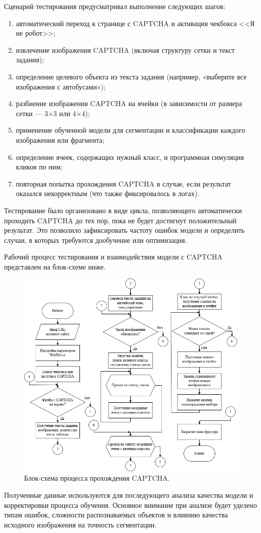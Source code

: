 Сценарий тестирования предусматривал выполнение следующих шагов:

\begin{enumerate}
    \item автоматический переход к странице с CAPTCHA и активация чекбокса <<Я не робот>>;
    \item извлечение изображения CAPTCHA (включая структуру сетки и текст задания);
    \item определение целевого объекта из текста задания (например, «выберите все изображения с автобусами»);
    \item разбиение изображения CAPTCHA на ячейки (в зависимости от размера сетки — 3×3 или 4×4);
    \item применение обученной модели для сегментации и классификации каждого изображения или фрагмента;
    \item определение ячеек, содержащих нужный класс, и программная симуляция кликов по ним;
    \item повторная попытка прохождения CAPTCHA в случае, если результат оказался некорректным (что также фиксировалось в логах).
\end{enumerate}

Тестирование было организовано в виде цикла, позволяющего автоматически проходить CAPTCHA до тех пор, пока не будет достигнут положительный результат. Это позволило зафиксировать частоту ошибок модели и определить случаи, в которых требуются дообучение или оптимизация.

Рабочий процесс тестирования и взаимодействия модели с CAPTCHA представлен на блок-схеме ниже.

\begin{figure}[H]
    \centering
    \includegraphics[width=1\textwidth]{imgs/solve_captcha_flow.png}
    \caption{Блок-схема процесса прохождения CAPTCHA.}
    \label{fig:solve-captcha}
\end{figure}
\vspace{-0.5cm}

Полученные данные используются для последующего анализа качества модели и корректировки процесса обучения. Основное внимание при анализе будет уделено типам ошибок, сложности распознаваемых объектов и влиянию качества исходного изображения на точность сегментации.
